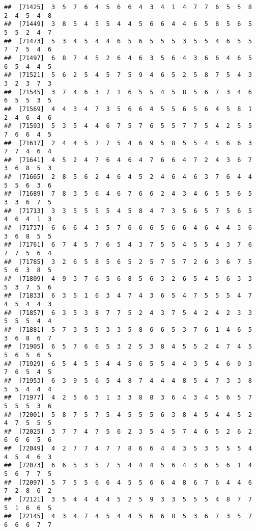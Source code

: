 \documentclass[
]{book}
\begin{document}
\begin{verbatim}
##  [71425]  3  5  7  6  4  5  6  6  4  3  4  1  4  7  7  6  5  5  8  2  4  5  4  8
##  [71449]  3  8  5  4  5  5  4  4  5  6  6  4  4  6  5  8  5  6  5  5  5  2  4  7
##  [71473]  5  3  4  5  4  4  6  5  6  5  5  5  3  5  5  4  6  5  5  7  7  5  4  6
##  [71497]  6  8  7  4  5  2  6  4  6  3  5  6  4  3  6  6  4  6  5  6  5  4  4  5
##  [71521]  5  6  2  5  4  5  7  5  9  4  6  5  2  5  8  7  5  4  3  3  2  3  7  3
##  [71545]  3  7  4  6  3  7  1  6  5  5  4  5  8  5  6  7  3  4  6  6  5  5  3  5
##  [71569]  4  4  3  4  7  3  5  6  6  4  5  5  6  5  6  4  5  8  1  2  4  6  4  6
##  [71593]  5  3  5  4  4  6  7  5  7  6  5  5  7  7  5  4  2  5  5  7  6  6  4  5
##  [71617]  2  4  4  5  7  7  5  4  6  9  5  8  5  5  4  5  6  6  3  7  7  4  6  4
##  [71641]  4  5  2  4  7  6  4  6  4  7  6  6  4  7  2  4  3  6  7  3  6  8  5  3
##  [71665]  2  8  5  6  2  4  6  4  5  2  4  6  4  6  3  7  6  4  4  5  5  6  3  6
##  [71689]  7  8  3  5  6  4  6  7  6  6  2  4  3  4  6  5  5  6  5  3  3  6  7  5
##  [71713]  3  3  5  5  5  5  4  5  8  4  7  3  5  6  5  7  5  6  5  4  6  4  1  3
##  [71737]  6  6  6  4  3  5  7  6  6  6  5  6  6  4  6  4  4  3  6  3  6  8  5  5
##  [71761]  6  7  4  5  7  6  5  4  3  7  5  5  4  5  5  4  3  7  6  7  7  5  6  4
##  [71785]  3  2  6  5  8  5  6  5  2  5  7  5  7  2  6  3  6  7  5  5  6  3  8  5
##  [71809]  4  9  3  7  6  5  6  8  5  6  3  2  6  5  4  5  6  3  3  5  3  7  5  6
##  [71833]  6  3  5  1  6  3  4  7  4  3  6  5  4  7  5  5  5  4  7  4  5  4  4  3
##  [71857]  6  3  5  3  8  7  7  5  2  4  3  7  5  4  2  4  2  3  3  5  5  5  4  4
##  [71881]  5  7  3  5  5  3  3  5  8  6  6  5  3  7  6  1  4  6  5  3  6  8  6  7
##  [71905]  6  5  7  6  6  5  3  2  5  3  8  4  5  5  2  4  7  4  5  5  6  5  6  5
##  [71929]  6  5  4  5  5  4  4  5  6  5  5  4  4  3  5  4  6  9  3  7  6  5  4  5
##  [71953]  6  3  9  5  6  5  4  8  7  4  4  4  8  5  4  7  3  3  8  5  5  4  4  4
##  [71977]  4  2  5  6  5  1  3  3  8  8  3  6  4  3  4  5  6  5  7  5  5  5  3  6
##  [72001]  5  8  7  5  7  5  4  5  5  5  6  3  8  4  5  4  4  5  2  4  7  5  5  5
##  [72025]  3  7  7  4  7  5  6  2  3  5  4  5  7  4  6  5  2  6  2  6  6  6  5  6
##  [72049]  4  2  7  7  4  7  7  8  6  6  4  4  3  5  3  5  5  5  4  4  5  4  6  3
##  [72073]  6  6  5  3  5  7  5  4  4  4  5  6  4  3  6  5  6  1  4  5  6  7  7  5
##  [72097]  5  7  5  5  6  6  4  5  5  6  6  4  8  6  7  6  4  4  6  7  2  8  6  2
##  [72121]  3  5  4  4  4  4  5  2  5  9  3  3  5  5  5  4  8  7  7  5  1  6  6  5
##  [72145]  4  3  4  7  4  5  4  4  5  6  6  8  5  3  6  7  3  5  7  6  6  6  7  7

\end{verbatim}
\end{document}
